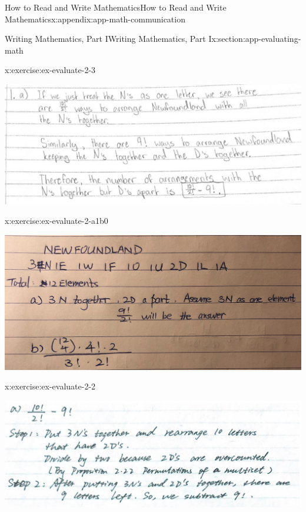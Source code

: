 \documentclass[oneside,10pt,]{book}
\numberwithin{equation}{section}
\begin{document}
\begin{appendixptx}{How to Read and Write Mathematics}{}{How to Read and Write Mathematics}{}{}{x:appendix:app-math-communication}
\begin{sectionptx}{Writing Mathematics, Part I}{}{Writing Mathematics, Part I}{}{}{x:section:app-evaluating-math}
\begin{inlineexercise}{}{x:exercise:ex-evaluate-2-3}
\begin{sidebyside}{1}{0}{0}{0}
\begin{sbspanel}{1}
\includegraphics[width=\linewidth]{images/Sept23-newfoundland-3.png}
\end{sbspanel}%
\end{sidebyside}%
\end{inlineexercise}%
\begin{inlineexercise}{}{x:exercise:ex-evaluate-2-a1b0}%
\begin{sidebyside}{1}{0}{0}{0}%
\begin{sbspanel}{1}%
\includegraphics[width=\linewidth]{images/Sept23-newfoundland-a1b0.png}
\end{sbspanel}%
\end{sidebyside}%
\end{inlineexercise}%
\begin{inlineexercise}{}{x:exercise:ex-evaluate-2-2}%
\begin{sidebyside}{1}{0}{0}{0}%
\begin{sbspanel}{1}%
\includegraphics[width=\linewidth]{images/Sept23-newfoundland-2.png}

\end{sbspanel}
\end{sidebyside}
\end{inlineexercise}
\end{sectionptx}
\end{appendixptx}
\end{document}
